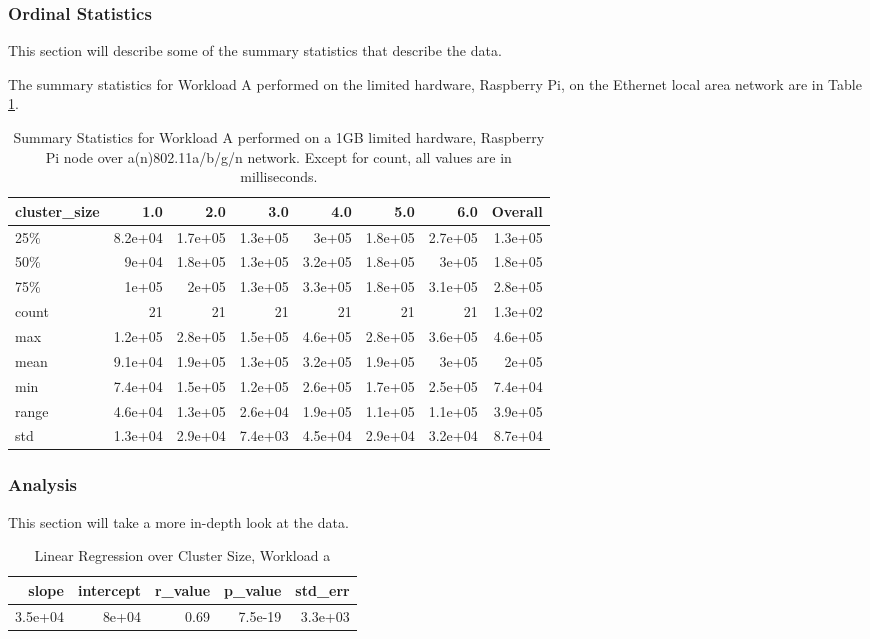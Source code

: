 \subsubsection{Ordinal Statistics}
This section will describe some of the summary statistics that describe the data.  

The summary statistics for Workload A performed on the limited hardware, Raspberry Pi, on the Ethernet local area network are in Table \ref{table:summary_table_a_1GB_rp_wlan}.
\begin{table}
\begin{tabular}{lrrrrrrr}
\toprule
cluster\_size &     1.0 &     2.0 &     3.0 &     4.0 &     5.0 &     6.0 &  Overall \\
\midrule
25\%   & 8.2e+04 & 1.7e+05 & 1.3e+05 &   3e+05 & 1.8e+05 & 2.7e+05 &  1.3e+05 \\
50\%   &   9e+04 & 1.8e+05 & 1.3e+05 & 3.2e+05 & 1.8e+05 &   3e+05 &  1.8e+05 \\
75\%   &   1e+05 &   2e+05 & 1.3e+05 & 3.3e+05 & 1.8e+05 & 3.1e+05 &  2.8e+05 \\
count &      21 &      21 &      21 &      21 &      21 &      21 &  1.3e+02 \\
max   & 1.2e+05 & 2.8e+05 & 1.5e+05 & 4.6e+05 & 2.8e+05 & 3.6e+05 &  4.6e+05 \\
mean  & 9.1e+04 & 1.9e+05 & 1.3e+05 & 3.2e+05 & 1.9e+05 &   3e+05 &    2e+05 \\
min   & 7.4e+04 & 1.5e+05 & 1.2e+05 & 2.6e+05 & 1.7e+05 & 2.5e+05 &  7.4e+04 \\
range & 4.6e+04 & 1.3e+05 & 2.6e+04 & 1.9e+05 & 1.1e+05 & 1.1e+05 &  3.9e+05 \\
std   & 1.3e+04 & 2.9e+04 & 7.4e+03 & 4.5e+04 & 2.9e+04 & 3.2e+04 &  8.7e+04 \\
\bottomrule
\end{tabular}
\caption{Summary Statistics for Workload A performed on a 1GB limited hardware, Raspberry Pi node over a(n)802.11a/b/g/n network.  Except for count, all values are in milliseconds.}
\label{table:summary_table_a_1GB_rp_wlan}
\end{table}



\subsubsection{Analysis}
This section will take a more in-depth look at the data.


\begin{table}[H]
\centering
\begin{tabular}{rrrrr}
\toprule
  slope &  intercept &  r\_value &  p\_value &  std\_err \\
\midrule
3.5e+04 &      8e+04 &     0.69 &  7.5e-19 &  3.3e+03 \\
\bottomrule
\end{tabular}
\caption{Linear Regression over Cluster Size, Workload a}
\label{table:wlan_only_a}
\end{table}



